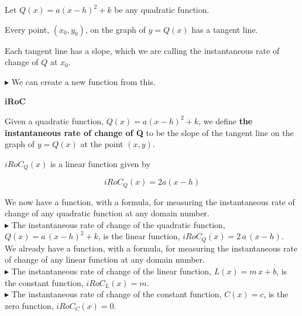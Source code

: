\documentclass{ximera}
\begin{document}
Let $Q(x) = a (x - h)^2 + k$ be any quadratic function.

Every point, $(x_0, y_0)$, on the graph of $y = Q(x)$ has a tangent line.

Each tangent line has a slope, which we are calling the instantaneous rate of change of $Q$ at $x_0$.


\textbf{\textcolor{red!90!darkgray}{$\blacktriangleright$}} We can create a new function from this.



\begin{definition} \textbf{\textcolor{green!50!black}{iRoC}}  


Given a quadratic function, $Q(x) = a (x - h)^2 + k$, we define \textbf{the instantaneous rate of change of Q} to be the slope of the tangent line on the graph of $y = Q(x)$ at the point $(x, y)$.

$iRoC_Q(x)$ is a linear function given by 

\[  iRoC_Q(x) = 2 a (x-h) \]

\end{definition}


We now have a function, with a formula, for measuring the instantaneous rate of change of any quadratic function at any domain number. \\


\textbf{\textcolor{red!90!darkgray}{$\blacktriangleright$}} The instantaneous rate of change of the quadratic function, $Q(x) = a \, (x - h)^2 + k$, is the linear function, $iRoC_Q(x) = 2 \, a \, (x-h)$. \\




We already have a function, with a formula, for measuring the instantaneous rate of change of any linear function at any domain number. \\ 


\textbf{\textcolor{red!90!darkgray}{$\blacktriangleright$}} The instantaneous rate of change of the linear function, $L(x) = m \, x + b$, is the constant function, $iRoC_L(x) = m$. \\



\textbf{\textcolor{red!90!darkgray}{$\blacktriangleright$}} The instantaneous rate of change of the constant function, $C(x) = c$, is the zero function, $iRoC_C(x) = 0$. \\
\end{document}
